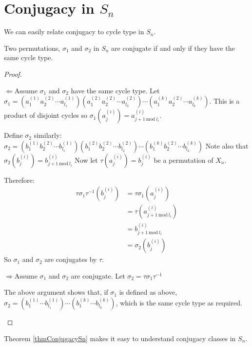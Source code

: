 \documentclass[../Main.tex]{subfiles}
\begin{document}
\section{Conjugacy in \texorpdfstring{$S_n$}{Sn}}
We can easily relate conjugacy to cycle type in $S_n$.
\begin{theorem}[Conjugacy in $S_n$]
    Two permutations, $\sigma_1$ and $\sigma_2$ in $S_n$ are conjugate if and only if they have the same cycle type.
    \label{thmConjugacySn}
\end{theorem}
\begin{proof}
    \begin{proofdirection}{$\Leftarrow$}{Assume $\sigma_1$ and $\sigma_2$ have the same cycle type.}
        Let $\sigma_1 = (a_1^{(1)} a_2^{(2)} \cdots a_{l_1}^{(1)})(a_1^{(2)} a_2^{(2)} \cdots a_{l_2}^{(2)})\cdots(a_1^{(k)} a_2^{(2)} \cdots a_{l_k}^{(k)})$. This is a product of disjoint cycles so $\sigma_1(a_j^{(i)}) = a_{j + 1~\text{mod}~l_i}^{(i)}$.\par
        Define $\sigma_2$ similarly: $\sigma_2 = (b_1^{(1)} b_2^{(2)} \cdots b_{l_1}^{(1)})(b_1^{(2)} b_2^{(2)} \cdots b_{l_2}^{(2)})\cdots(b_1^{(k)} b_2^{(2)} \cdots b_{l_k}^{(k)})$ Note also that $\sigma_2(b_j^{(i)}) = b_{j + 1~\text{mod}~l_i}^{(i)}$
        Now let $\tau(a_j^{(i)}) = b_j^{(i)}$ be a permutation of $X_n$.\par
        Therefore:
        \begin{align*}
            \tau \sigma_1 \tau^{-1}(b_j^{(i)}) &= \tau \sigma_1(a_j^{(i)}) \\
            &= \tau(a_{j + 1~\text{mod}~l_i}^{(i)}) \\
            &= b_{j + 1~\text{mod}~l_i}^{(i)} \\
            &= \sigma_2(b_j^{(i)})
        \end{align*}
        So $\sigma_1$ and $\sigma_2$ are conjugates by $\tau$.
    \end{proofdirection}
    \begin{proofdirection}{$\Rightarrow$}{Assume $\sigma_1$ and $\sigma_2$ are conjugate.}
        Let $\sigma_2 = \tau \sigma_1 \tau^{-1}$\par
        The above argument shows that, if $\sigma_1$ is defined as above, $\sigma_2 = (b_1^{(1)} \cdots b_{l_1}^{(1)}) \cdots (b_1^{(k)} \cdots b_{l_k}^{(k)})$, which is the same cycle type as required.
    \end{proofdirection}
\end{proof}
Theorem \ref{thmConjugacySn} makes it easy to understand conjugacy classes in $S_n$.
\end{document}
